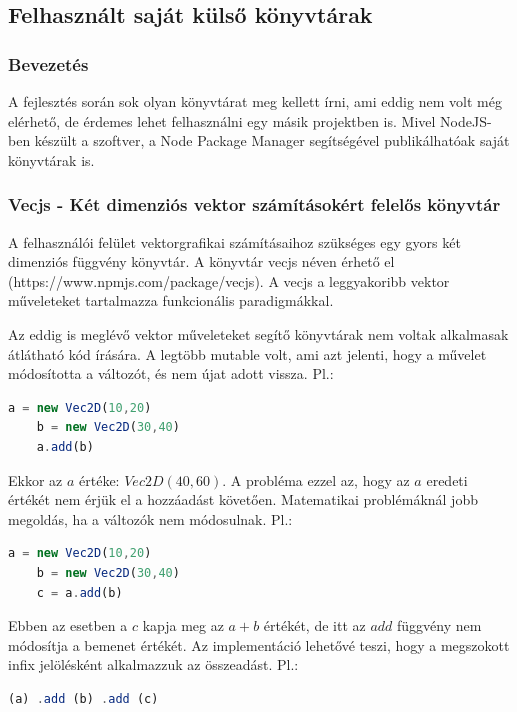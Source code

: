 \documentclass[a4paper,12pt,oneside]{report}
\begin{document}
\subsection{Felhasznált saját külső könyvtárak}
\subsubsection{Bevezetés}

\begin{justify}

	A fejlesztés során sok olyan könyvtárat meg kellett írni, ami eddig nem volt még elérhető, de érdemes lehet felhasználni egy másik projektben is. Mivel NodeJS-ben készült a szoftver, a Node Package Manager segítségével publikálhatóak saját könyvtárak is.


\end{justify}
\newpage
\subsubsection{Vecjs - Két dimenziós vektor számításokért felelős könyvtár}

\begin{justify}

    A felhasználói felület vektorgrafikai számításaihoz szükséges egy gyors két dimenziós függvény könyvtár. A könyvtár vecjs néven érhető el (https://www.npmjs.com/package/vecjs). A vecjs a leggyakoribb vektor műveleteket tartalmazza funkcionális paradigmákkal. 
    
    Az eddig is meglévő vektor műveleteket segítő könyvtárak nem voltak alkalmasak átlátható kód írására. A legtöbb mutable volt, ami azt jelenti, hogy a művelet módosította a változót, és nem újat adott vissza. Pl.:

	\begin{lstlisting}[language=javascript]
	a = new Vec2D(10,20)
	b = new Vec2D(30,40)
	a.add(b)
	\end{lstlisting}

	Ekkor az $ a $ értéke: $ Vec2D(40,60) $. A probléma ezzel az, hogy az $ a $ eredeti értékét nem érjük el a hozzáadást követően. Matematikai problémáknál jobb megoldás, ha a változók nem módosulnak. Pl.:

	\begin{lstlisting}[language=javascript]
	a = new Vec2D(10,20)
	b = new Vec2D(30,40)
	c = a.add(b)
	\end{lstlisting}

	Ebben az esetben a $ c $ kapja meg az $ a + b $ értékét, de itt az $ add $ függvény nem módosítja a bemenet értékét. Az implementáció lehetővé teszi, hogy a megszokott infix jelölésként alkalmazzuk az összeadást. Pl.:

	\begin{lstlisting}[language=javascript]
	(a) .add (b) .add (c)
	\end{lstlisting}

\end{justify}
\newpage
\end{document}
